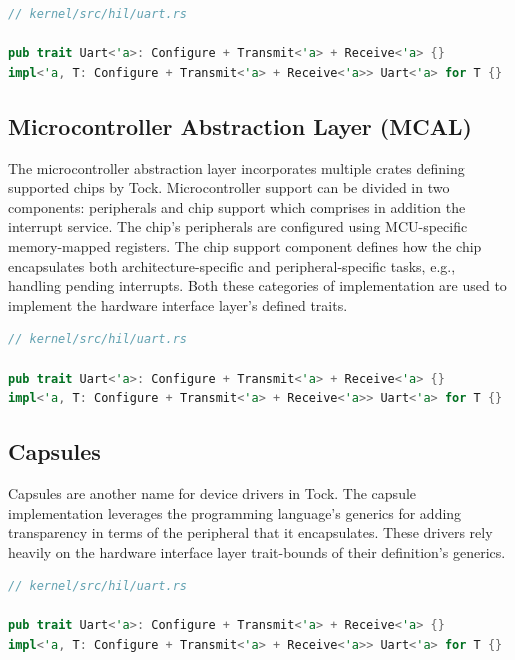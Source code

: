 \documentclass[12pt,a4paper]{report}
\begin{document}
\begin{lstlisting}[caption={Blanket trait encorporating the UART functionalities},label={lst:uart-trait},language=Rust]
// kernel/src/hil/uart.rs

pub trait Uart<'a>: Configure + Transmit<'a> + Receive<'a> {}
impl<'a, T: Configure + Transmit<'a> + Receive<'a>> Uart<'a> for T {}
\end{lstlisting}

\newpage
\subsection{Microcontroller Abstraction Layer (MCAL)}

The microcontroller abstraction layer incorporates multiple crates defining supported chips by Tock. Microcontroller support can be divided in two components: peripherals and chip support which comprises in addition the interrupt service. The chip's peripherals are configured using MCU-specific memory-mapped registers. The chip support component defines how the chip encapsulates both architecture-specific and peripheral-specific tasks, e.g., handling pending interrupts. Both these categories of implementation are used to implement the hardware interface layer's defined traits.

\begin{lstlisting}[caption={Configure trait implementation for Uart peripheral struct},label={lst:uart-impl},language=Rust]
// kernel/src/hil/uart.rs

pub trait Uart<'a>: Configure + Transmit<'a> + Receive<'a> {}
impl<'a, T: Configure + Transmit<'a> + Receive<'a>> Uart<'a> for T {}
\end{lstlisting}

\subsection{Capsules}

Capsules are another name for device drivers in Tock. The capsule implementation leverages the programming language's generics for adding transparency in terms of the peripheral that it encapsulates. These drivers rely heavily on the hardware interface layer trait-bounds of their definition's generics.

\begin{lstlisting}[caption={Console capsule struct definition},label={lst:console-strct},language=Rust]
// kernel/src/hil/uart.rs

pub trait Uart<'a>: Configure + Transmit<'a> + Receive<'a> {}
impl<'a, T: Configure + Transmit<'a> + Receive<'a>> Uart<'a> for T {}
\end{lstlisting}
\end{document}
